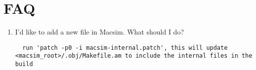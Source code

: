 

\chapter{FAQ}
\label{sec:faq}

\begin{enumerate}
\item I'd like to add a new file in Macsim. What should I do? 

\begin{verbatim}  run 'patch -p0 -i macsim-internal.patch', this will update <macsim_root>/.obj/Makefile.am to include the internal files in the build 
\end{verbatim}
\end{enumerate}
